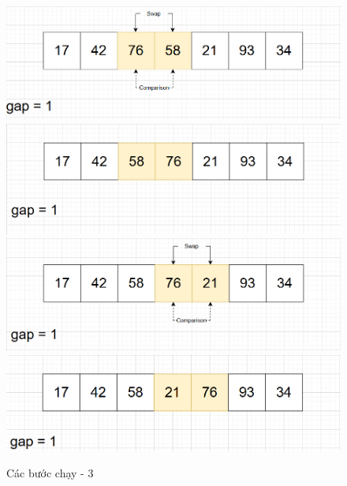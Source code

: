 \begin{figure}[H]
    \centering
    \includegraphics[width=1\linewidth]{img/shell_sort/09.png}
    \vspace{0.15cm}
    \includegraphics[width=1\linewidth]{img/shell_sort/10.png}
    \vspace{0.15cm}
    \includegraphics[width=1\linewidth]{img/shell_sort/11.png}
    \vspace{0.15cm}
    \includegraphics[width=1\linewidth]{img/shell_sort/12.png}
    \caption{Các bước chạy - 3}
    \label{fig:part3}
\end{figure}

